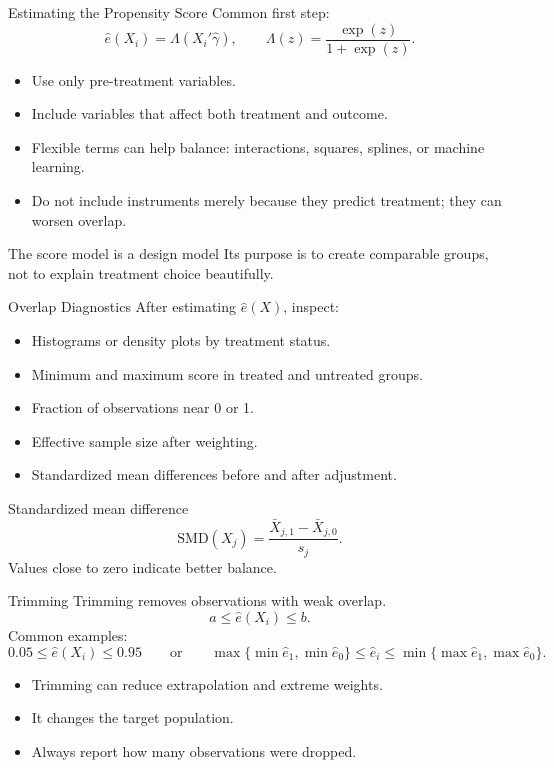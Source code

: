 \documentclass[11pt,aspectratio=169]{beamer}
\newcommand{\derivbutton}[1]{\vspace{0.4em}\hfill\hyperlink{app:#1}{\beamerbutton{Appendix details}}}
\begin{document}
\begin{frame}{Estimating the Propensity Score}
  Common first step:
  \[
    \widehat{e}(X_i)
    =
    \Lambda(X_i'\widehat{\gamma}),
    \qquad
    \Lambda(z)=\frac{\exp(z)}{1+\exp(z)}.
  \]
  \begin{itemize}
    \item Use only pre-treatment variables.
    \item Include variables that affect both treatment and outcome.
    \item Flexible terms can help balance: interactions, squares, splines, or machine learning.
    \item Do not include instruments merely because they predict treatment; they can worsen overlap.
  \end{itemize}
  \begin{block}{The score model is a design model}
    Its purpose is to create comparable groups, not to explain treatment choice beautifully.
  \end{block}
\end{frame}

\begin{frame}{Overlap Diagnostics}
  \hypertarget{main:diagnostics}{}
  After estimating \(\widehat{e}(X)\), inspect:
  \begin{itemize}
    \item Histograms or density plots by treatment status.
    \item Minimum and maximum score in treated and untreated groups.
    \item Fraction of observations near 0 or 1.
    \item Effective sample size after weighting.
    \item Standardized mean differences before and after adjustment.
  \end{itemize}
  \begin{block}{Standardized mean difference}
    \[
      \mathrm{SMD}(X_j)
      =
      \frac{\bar{X}_{j,1}-\bar{X}_{j,0}}{s_j}.
    \]
    Values close to zero indicate better balance.
  \end{block}
\end{frame}

\begin{frame}{Trimming}
  \hypertarget{main:trimming}{}
  Trimming removes observations with weak overlap.
  \[
    a \leq \widehat{e}(X_i) \leq b.
  \]
  Common examples:
  \[
    0.05\leq \widehat{e}(X_i)\leq 0.95
    \qquad \text{or} \qquad
    \max\{\min \widehat{e}_1,\min \widehat{e}_0\}
    \leq
    \widehat{e}_i
    \leq
    \min\{\max \widehat{e}_1,\max \widehat{e}_0\}.
  \]
  \begin{itemize}
    \item Trimming can reduce extrapolation and extreme weights.
    \item It changes the target population.
    \item Always report how many observations were dropped.
  \end{itemize}
  \derivbutton{overlap-trimming}
\end{frame}
\end{document}
